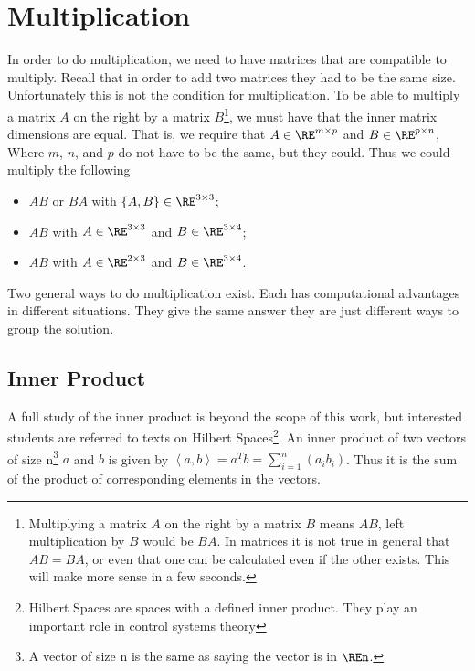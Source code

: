 \section{Multiplication}

In order to do multiplication, we need to have matrices that are compatible to multiply.  Recall that in order to add two matrices they had to be the same size.  Unfortunately this is not the condition for multiplication.  To be able to multiply a matrix $A$ on the right by a matrix $B$\footnote{Multiplying a matrix $A$ on the right by a matrix $B$ means $AB$, left multiplication by $B$ would be $BA$.  In matrices it is not true in general that $AB=BA$, or even that one can be calculated even if the other exists.  This will make more sense in a few seconds.}, we must have that the inner matrix dimensions are equal.  That is, we require that $A\in\RE^{m\times p}$ and $B\in\RE^{p\times n}$, Where $m$, $n$, and $p$ do not have to be the same, but they could.  Thus we could multiply the following
\begin{itemize}
    \item $AB$ or $BA$ with $\{A,B\}\in\RE^{3\times 3}$;
    \item $AB$ with $A\in\RE^{3\times 3}$ and $B\in\RE^{3\times 4}$;
    \item $AB$ with $A\in\RE^{2\times 3}$ and $B\in\RE^{3\times 4}$.
\end{itemize}
Two general ways to do multiplication exist.  Each has computational advantages in different situations.  They give the same answer they are just different ways to group the solution.

\subsection{Inner Product}

A full study of the inner product is beyond the scope of this work, but interested students are referred to texts on Hilbert Spaces\footnote{Hilbert Spaces are spaces with a defined inner product.  They play an important role in control systems theory}.  An inner product of two vectors of size n\footnote{A vector of size n is the same as saying the vector is in $\REn$.} $a$ and $b$ is given by $\left<a,b\right> = a^Tb=\sum_{i=1}^n(a_ib_i)$.  Thus it is the sum of the product of corresponding elements in the vectors.

